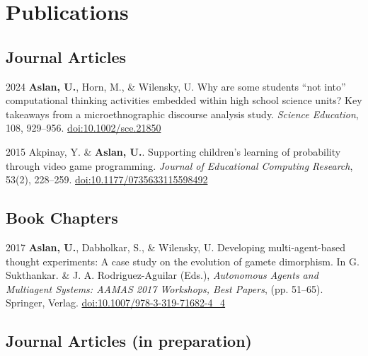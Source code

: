 \documentclass[11pt,letterpaper]{report} %
\begin{document}
    \section*{Publications}

    \subsection*{Journal Articles}

    \begin{tablist}

        \item[2024] \tab{}\textbf{Aslan, U.}, Horn, M., \& Wilensky, U. Why are some students \enquote{not into} computational thinking activities embedded within high school science units? Key takeaways from a microethnographic discourse analysis study. \textit{Science Education}, 108, 929--956. \href{https://doi.org/10.1002/sce.21850}{doi:10.1002/sce.21850}

        \item[2015] \tab{}Akpinay, Y. \& \textbf{Aslan, U.}. Supporting children's learning of probability through video game programming. \textit{Journal of Educational Computing Research}, 53(2), 228--259. \href{https://doi.org/10.1177/0735633115598492}{doi:10.1177/0735633115598492}

    \end{tablist}



    \subsection*{Book Chapters}

    \begin{tablist}

        \item[2017] \tab{}\textbf{Aslan, U.}, Dabholkar, S., \& Wilensky, U. Developing multi-agent-based thought experiments: A case study on the evolution of gamete dimorphism. In G. Sukthankar. \& J. A. Rodriguez-Aguilar (Eds.), \textit{Autonomous Agents and Multiagent Systems: AAMAS 2017 Workshops, Best Papers}, (pp. 51--65). Springer, Verlag. \href{https://doi.org/10.1007/978-3-319-71682-4\_4}{doi:10.1007/978-3-319-71682-4\_4}

    \end{tablist}

    \subsection*{Journal Articles (in preparation)}
\end{document}
